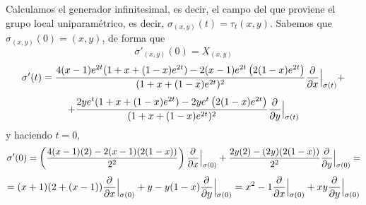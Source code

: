 \begin{sol}
    Calculamos el generador infinitesimal, es decir, el campo del que proviene el grupo local uniparam\'etrico, es decir, $\sigma_{(x,y)}(t) = \tau_t(x,y)$. Sabemos que $\sigma_{(x,y)}(0) = (x,y)$, de forma que 
    $$\sigma'_{(x,y)}(0)=X_{(x,y)}$$
    $$\sigma'(t) = \dfrac{4(x-1) e^{2t} (1+x+(1-x) e^{2t}) - 2(x-1)e^{2t}\left( 2(1-x)e^{2t}\right)}{(1+x+(1-x)e^{2t})^2} \dfrac{\partial^{} }{\partial x}\Big|_{\sigma(t)} + $$ 
    $$ +\dfrac{2ye^t (1+x+(1-x) e^{2t}) - 2ye^{t}\left( 2(1-x)e^{2t}\right)}{(1+x+(1-x)e^{2t})^2} \dfrac{\partial^{} }{\partial y}\Big|_{\sigma(t)} $$
    y haciendo $t=0$,
    $$\sigma'(0)=\left( \dfrac{4(x-1)(2) - 2(x-1)(2(1-x))}{2^2} \right) \dfrac{\partial^{} }{\partial x}\Big|_{\sigma(0)} + \dfrac{2y(2) - (2y)(2(1-x))}{2^2} \dfrac{\partial^{} }{\partial y} \Big|_{\sigma(0)} = $$
    $$= (x+1)(2+(x-1))\dfrac{\partial^{} }{\partial x} \Big|_{\sigma(0)}+y-y(1-x) \dfrac{\partial^{} }{\partial y} \Big|_{\sigma(0)}  = x^2-1 \dfrac{\partial^{} }{\partial x} \Big|_{\sigma(0)}+ xy\dfrac{\partial^{} }{\partial y} \Big|_{\sigma(0)} $$
\end{sol}
